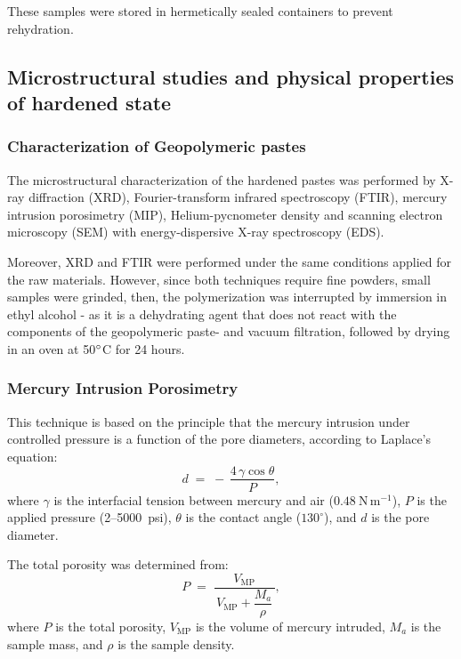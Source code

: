 These samples were stored in hermetically sealed containers to prevent rehydration.

\subsection{Microstructural studies and physical properties of hardened state}
\label{sec:microstructural_studies_physical_properties_hardened_state}

\subsubsection{Characterization of Geopolymeric pastes}
\label{sec:characterization_geopolymeric_pastes}

The microstructural characterization of the hardened pastes was performed by X-ray diffraction (XRD), Fourier-transform infrared spectroscopy (FTIR), mercury intrusion porosimetry (MIP), Helium-pycnometer density and scanning electron microscopy (SEM) with energy-dispersive X-ray spectroscopy (EDS). 

Moreover, XRD and FTIR were performed under the same conditions applied for the raw materials.
However, since both techniques require fine powders, small samples were grinded, then, the polymerization was interrupted by immersion in ethyl alcohol - as it is a dehydrating agent that does not react with the components of the geopolymeric paste- and vacuum filtration, followed by drying in an oven at 50$^{\circ}$C for 24 hours.

\subsubsection{Mercury Intrusion Porosimetry}

This technique is based on the principle that the mercury intrusion under controlled pressure is a function of the pore diameters, according to Laplace’s equation:
\begin{equation}
    d \;=\; -\,\frac{4\,\gamma \cos\theta}{P},
\end{equation}
where $\gamma$ is the interfacial tension between mercury and air ($0.48\ \mathrm{N\,m^{-1}}$), $P$ is the applied pressure (2–5000~psi), $\theta$ is the contact angle ($130^\circ$), and $d$ is the pore diameter.

The total porosity was determined from:
\begin{equation}
    P \;=\; \frac{V_{\mathrm{MP}}}{\,V_{\mathrm{MP}} + \dfrac{M_a}{\rho}\,}, 
\end{equation}
where $P$ is the total porosity, $V_{\mathrm{MP}}$ is the volume of mercury intruded, $M_a$ is the sample mass, and $\rho$ is the sample density.

